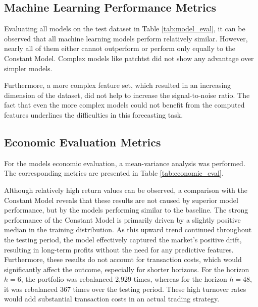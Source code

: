 \documentclass[12pt,twoside=false,a4paper,parskip]{scrbook}
\begin{document}
\subsection{Machine Learning Performance Metrics}
Evaluating all models on the test dataset in Table \ref{tab:model_eval}, it can be observed that all machine learning models perform relatively similar. However, nearly all of them either cannot outperform or perform only equally to the Constant Model.
Complex models like \gls{patchtst} did not show any advantage over simpler models.

Furthermore, a more complex feature set, which resulted in an increasing dimension of the dataset, did not help to increase the signal-to-noise ratio. The fact that even the more complex models could not benefit from the computed features underlines the difficulties in this forecasting task.

\subsection{Economic Evaluation Metrics}
For the models economic evaluation, a mean-variance analysis was performed. The corresponding metrics are presented in Table \ref{tab:economic_eval}.

Although relatively high return values can be observed, a comparison with the Constant Model reveals that these results are not caused by superior model performance, but by the models performing similar to the baseline. The strong performance of the Constant Model is primarily driven by a slightly positive median in the training distribution. As this upward trend continued throughout the testing period, the model effectively captured the market's positive drift, resulting in long-term profits without the need for any predictive features. 
Furthermore, these results do not account for transaction costs, which would significantly affect the outcome, especially for shorter horizons. For the horizon $h = 6$, the portfolio was rebalanced 2,929 times, whereas for the horizon $h = 48$, it was rebalanced 367 times over the testing period. These high turnover rates would add substantial transaction costs in an actual trading strategy.
\end{document}
